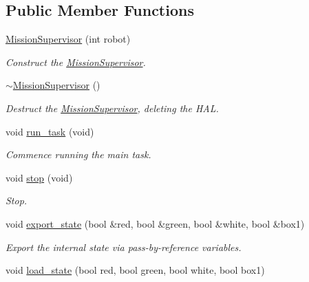 \subsection*{Public Member Functions}
\begin{DoxyCompactItemize}
\item 
\hyperlink{classIDP_1_1MissionSupervisor_afc6a54e04718d919b2b48458a47304b2}{MissionSupervisor} (int robot)
\begin{DoxyCompactList}\small\item\em Construct the \hyperlink{classIDP_1_1MissionSupervisor}{MissionSupervisor}. \item\end{DoxyCompactList}\item 
\hyperlink{classIDP_1_1MissionSupervisor_aa43dab8c02cd596d0f5df6b3af5aade4}{$\sim$MissionSupervisor} ()
\begin{DoxyCompactList}\small\item\em Destruct the \hyperlink{classIDP_1_1MissionSupervisor}{MissionSupervisor}, deleting the HAL. \item\end{DoxyCompactList}\item 
void \hyperlink{classIDP_1_1MissionSupervisor_a76ff7fad2edcb7f7181b43c3fc01b01e}{run\_\-task} (void)
\begin{DoxyCompactList}\small\item\em Commence running the main task. \item\end{DoxyCompactList}\item 
void \hyperlink{classIDP_1_1MissionSupervisor_ae0c5ee275ed6d1a40a47bea80ef59f6a}{stop} (void)
\begin{DoxyCompactList}\small\item\em Stop. \item\end{DoxyCompactList}\item 
void \hyperlink{classIDP_1_1MissionSupervisor_a9de3aaeb91da90961de5938eda7c7d08}{export\_\-state} (bool \&red, bool \&green, bool \&white, bool \&box1)
\begin{DoxyCompactList}\small\item\em Export the internal state via pass-\/by-\/reference variables. \item\end{DoxyCompactList}\item 
void \hyperlink{classIDP_1_1MissionSupervisor_aaacc8e7082596ecf603d05fdc01e5245}{load\_\-state} (bool red, bool green, bool white, bool box1)

\end{DoxyCompactItemize}

